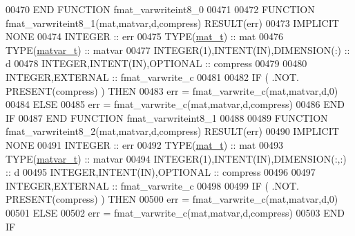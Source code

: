 \begin{DoxyCode}
00470 \textcolor{keyword}{END FUNCTION }fmat\_varwriteint8\_0
00471 
00472 \textcolor{keyword}{FUNCTION }fmat\_varwriteint8\_1(mat,matvar,d,compress) \textcolor{keyword}{RESULT}(err)
00473 \textcolor{keywordtype}{IMPLICIT NONE}
00474     \textcolor{keywordtype}{INTEGER}                                  :: err
00475     \textcolor{keywordtype}{TYPE}(\hyperlink{group___m_a_t_gab0fc888f5a5d79943b16284b1f91c2e8}{mat\_t})                              :: mat
00476     \textcolor{keywordtype}{TYPE}(\hyperlink{group___m_a_t_structmatvar__t}{matvar\_t})                           :: matvar
00477     \textcolor{keywordtype}{INTEGER(1)},\textcolor{keywordtype}{INTENT(IN)},\textcolor{keywordtype}{DIMENSION(:)}       :: d
00478     \textcolor{keywordtype}{INTEGER},\textcolor{keywordtype}{INTENT(IN)},\textcolor{keywordtype}{OPTIONAL}              :: compress
00479 
00480     \textcolor{keywordtype}{INTEGER},\textcolor{keywordtype}{EXTERNAL}                         :: fmat\_varwrite\_c
00481 
00482     \textcolor{keywordflow}{IF} ( .NOT. \textcolor{keyword}{PRESENT}(compress) ) \textcolor{keywordflow}{THEN}
00483         err = fmat\_varwrite\_c(mat,matvar,d,0)
00484     \textcolor{keywordflow}{ELSE}
00485         err = fmat\_varwrite\_c(mat,matvar,d,compress)
00486 \textcolor{keywordflow}{    END IF}
00487 \textcolor{keyword}{END FUNCTION }fmat\_varwriteint8\_1
00488 
00489 \textcolor{keyword}{FUNCTION }fmat\_varwriteint8\_2(mat,matvar,d,compress) \textcolor{keyword}{RESULT}(err)
00490 \textcolor{keywordtype}{IMPLICIT NONE}
00491     \textcolor{keywordtype}{INTEGER}                                  :: err
00492     \textcolor{keywordtype}{TYPE}(\hyperlink{group___m_a_t_gab0fc888f5a5d79943b16284b1f91c2e8}{mat\_t})                              :: mat
00493     \textcolor{keywordtype}{TYPE}(\hyperlink{group___m_a_t_structmatvar__t}{matvar\_t})                           :: matvar
00494     \textcolor{keywordtype}{INTEGER(1)},\textcolor{keywordtype}{INTENT(IN)},\textcolor{keywordtype}{DIMENSION(:,:)}     :: d
00495     \textcolor{keywordtype}{INTEGER},\textcolor{keywordtype}{INTENT(IN)},\textcolor{keywordtype}{OPTIONAL}              :: compress
00496 
00497     \textcolor{keywordtype}{INTEGER},\textcolor{keywordtype}{EXTERNAL}                         :: fmat\_varwrite\_c
00498 
00499     \textcolor{keywordflow}{IF} ( .NOT. \textcolor{keyword}{PRESENT}(compress) ) \textcolor{keywordflow}{THEN}
00500         err = fmat\_varwrite\_c(mat,matvar,d,0)
00501     \textcolor{keywordflow}{ELSE}
00502         err = fmat\_varwrite\_c(mat,matvar,d,compress)
00503 \textcolor{keywordflow}{    END IF}

\end{DoxyCode}
